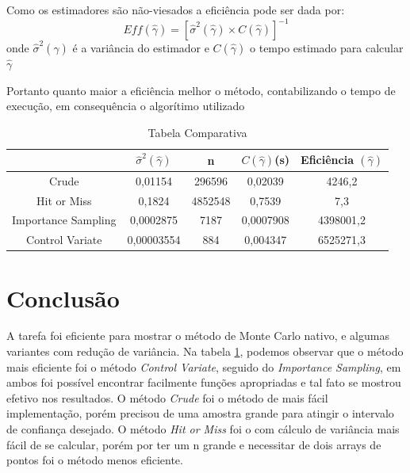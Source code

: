 \documentclass{article}
\begin{document}
Como os estimadores são não-viesados a eficiência pode ser dada por:
\begin{equation*}
    Eff(\hat{\gamma}) = [{\hat{\sigma}}^2(\hat{\gamma}) \times C(\hat{\gamma})]^{-1}
\end{equation*}
onde ${\hat{\sigma}^2}(\hat{\gamma})$ é a variância do estimador e $C(\hat{\gamma})$ o tempo estimado para calcular $\hat{\gamma}$

Portanto quanto maior a eficiência melhor o método, contabilizando o tempo de execução, em consequência o algorítimo utilizado\newline

    
\begin{table}[H]
\begin{center}
    \begin{tabular}{|c|c|c|c|c|}
    \hline
                        & $\hat{\sigma}^2(\hat{\gamma})$  & n       & $C(\hat{\gamma})$(s)    & Eficiência $(\hat{\gamma})$ \\ \hline
    Crude               & 0,01154    & 296596  & 0,02039   & 4246,2    \\ \hline
    Hit or Miss         & 0,1824     & 4852548 & 0,7539    & 7,3       \\ \hline
    Importance Sampling & 0,0002875  & 7187    & 0,0007908 & 4398001,2  \\ \hline
    Control Variate     & 0,00003554 & 884     & 0,004347  & 6525271,3  \\ \hline
    \end{tabular}
    \caption{Tabela Comparativa}
    \label{tab:comparacao}
\end{center}
\end{table}

\newpage
\section{Conclusão}

A tarefa foi eficiente para mostrar o método de Monte Carlo nativo, e algumas variantes com redução de variância.
Na tabela \ref{tab:comparacao}, podemos observar que o método mais eficiente foi o método \textit{Control Variate}, seguido do \textit{Importance Sampling}, em ambos foi possível encontrar facilmente funções apropriadas e tal fato se mostrou efetivo nos resultados.
O método \textit{Crude} foi o método de mais fácil implementação, porém precisou de uma amostra grande para atingir o intervalo de confiança desejado. O método \textit{Hit or Miss} foi o com cálculo de variância mais fácil de se calcular, porém por ter um n grande e necessitar de dois arrays de pontos foi o método menos eficiente.


\newpage


\end{document}
